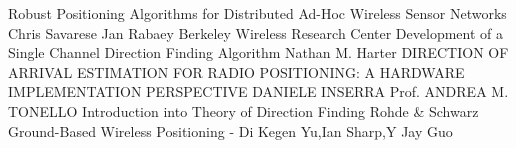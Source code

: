 \begin{thebibliography}{10}
 Robust Positioning Algorithms for Distributed Ad-Hoc Wireless Sensor Networks
Chris Savarese Jan Rabaey 
Berkeley Wireless Research Center 
 Development of a Single Channel Direction Finding Algorithm
Nathan M. Harter
 DIRECTION OF ARRIVAL ESTIMATION FOR RADIO POSITIONING:
A HARDWARE IMPLEMENTATION PERSPECTIVE
DANIELE INSERRA
Prof. ANDREA M. TONELLO
 Introduction into Theory of Direction Finding
Rohde & Schwarz
\bibitem Ground-Based Wireless Positioning - Di Kegen Yu,Ian Sharp,Y Jay Guo
\end{thebibliography}
